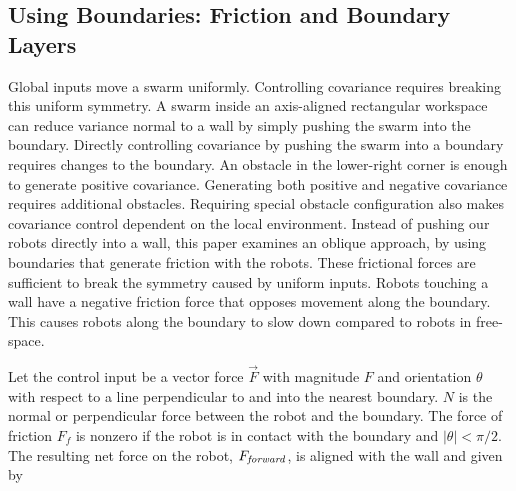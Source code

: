 \subsection{Using Boundaries: Friction and Boundary Layers}\label{subsec:WallFriction}
Global inputs move a swarm uniformly.  
Controlling covariance requires breaking this uniform symmetry.  A swarm inside an axis-aligned rectangular workspace can reduce variance normal to a wall by simply pushing the swarm into the boundary. Directly controlling covariance by pushing the swarm into a boundary requires changes to the boundary.  An obstacle in the lower-right corner is enough to generate positive covariance.  Generating both positive and negative covariance requires additional obstacles.  Requiring special obstacle configuration also makes covariance control dependent on the local environment. 
  Instead of pushing our robots directly into a wall, this paper examines an oblique approach, by using boundaries that generate friction with the robots.  These frictional forces are  sufficient to break the symmetry caused by uniform inputs.  Robots touching a wall have a negative friction force that opposes movement along the boundary.  This  causes robots along the boundary to slow down compared to robots in free-space. 
  
Let the control input be a vector force $\vec{F}$ with magnitude $F$ and orientation $\theta$ with respect to a line perpendicular to and into the nearest boundary. $N$ is the normal or perpendicular force between the robot and the boundary. The force of friction $F_f$ is nonzero if the robot is in contact with the boundary and  $|\theta| < \pi/2$. The resulting net force on the robot, $F_{\text{\emph{forward}}}$, is aligned with the wall and given by

